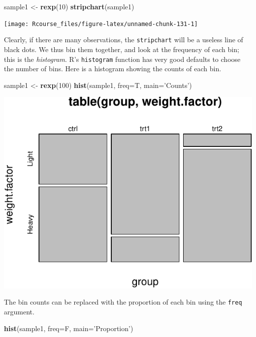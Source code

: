 \documentclass[]{book}
\newenvironment{Shaded}{\begin{snugshade}}{\end{snugshade}}
\newcommand{\KeywordTok}[1]{\textcolor[rgb]{0.13,0.29,0.53}{\textbf{#1}}}
\newcommand{\DataTypeTok}[1]{\textcolor[rgb]{0.13,0.29,0.53}{#1}}
\newcommand{\DecValTok}[1]{\textcolor[rgb]{0.00,0.00,0.81}{#1}}
\newcommand{\StringTok}[1]{\textcolor[rgb]{0.31,0.60,0.02}{#1}}
\newcommand{\NormalTok}[1]{#1}
\theoremstyle{definition}
\theoremstyle{definition}
\theoremstyle{definition}
\theoremstyle{remark}
\begin{document}
\begin{Shaded}
\begin{Highlighting}[]
\NormalTok{sample1 <-}\StringTok{ }\KeywordTok{rexp}\NormalTok{(}\DecValTok{10}\NormalTok{)                             }
\KeywordTok{stripchart}\NormalTok{(sample1)}
\end{Highlighting}
\end{Shaded}

\texttt{[image: Rcourse\_files/figure-latex/unnamed-chunk-131-1]}

Clearly, if there are many observations, the \texttt{stripchart} will be
a useless line of black dots. We thus bin them together, and look at the
frequency of each bin; this is the \emph{histogram}. R's
\texttt{histogram} function has very good defaults to choose the number
of bins. Here is a histogram showing the counts of each bin.

\begin{Shaded}
\begin{Highlighting}[]
\NormalTok{sample1 <-}\StringTok{ }\KeywordTok{rexp}\NormalTok{(}\DecValTok{100}\NormalTok{)                            }
\KeywordTok{hist}\NormalTok{(sample1, }\DataTypeTok{freq=}\NormalTok{T, }\DataTypeTok{main=}\StringTok{'Counts'}\NormalTok{)        }
\end{Highlighting}
\end{Shaded}

\includegraphics[width=0.5\linewidth]{Rcourse_files/figure-latex/unnamed-chunk-132-1}

The bin counts can be replaced with the proportion of each bin using the
\texttt{freq} argument.

\begin{Shaded}
\begin{Highlighting}[]
\KeywordTok{hist}\NormalTok{(sample1, }\DataTypeTok{freq=}\NormalTok{F, }\DataTypeTok{main=}\StringTok{'Proportion'}\NormalTok{)    }
\end{Highlighting}
\end{Shaded}
\end{document}
